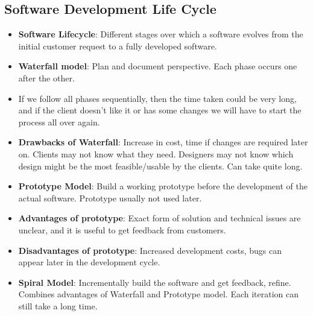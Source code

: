 \documentclass[a4paper]{article}
\begin{document}
\subsection{Software Development Life Cycle}
\begin{itemize}
    \item \textbf{Software Lifecycle}: Different stages over which a software evolves from the initial customer request to a fully developed software.
    \item \textbf{Waterfall model}: Plan and document perspective. Each phase occurs one after the other.
    \item If we follow all phases sequentially, then the time taken could be very long, and if the client doesn't like it or has some changes we will have to start the process all over again.
    \item \textbf{Drawbacks of Waterfall}: Increase in cost, time if changes are required later on. Clients may not know what they need. Designers may not know which design might be the most feasible/usable by the clients. Can take quite long.
    \item \textbf{Prototype Model}: Build a working prototype before the development of the actual software. Prototype usually not used later.
    \item \textbf{Advantages of prototype}: Exact form of solution and technical issues are unclear, and it is useful to get feedback from customers.
    \item \textbf{Disadvantages of prototype}: Increased development costs, bugs can appear later in the development cycle.
    \item \textbf{Spiral Model}: Incrementally build the software and get feedback, refine. Combines advantages of Waterfall and Prototype model. Each iteration can still take a long time.
\end{itemize}
\end{document}
